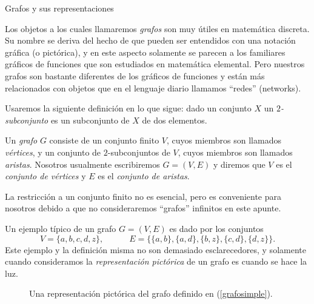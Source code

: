 \begin{section}{Grafos y sus representaciones}\label{5.1}

Los objetos a los cuales llamaremos \textit{grafos} son muy útiles en matemática discreta. Su nombre se deriva del hecho de que pueden ser entendidos con una notación gráfica (o pictórica), y en este aspecto solamente se parecen a los familiares gráficos de funciones que son estudiados en matemática elemental. Pero
nuestros grafos son bastante diferentes de los gráficos de funciones y están más relacionados con objetos que en el lenguaje diario llamamos ``redes'' (networks).  

Usaremos la siguiente definición en lo que sigue: dado un conjunto $X$ un \textit{$2$-subconjunto} es un subconjunto de $X$ de dos elementos.  

\begin{definicion} Un \textit{grafo} $G$ consiste de un   conjunto finito $V$, cuyos miembros son llamados  \textit{vértices},   y un conjunto de $2$-subconjuntos de $V$, cuyos miembros son llamados \textit{aristas}.   Nosotros usualmente escribiremos $G=(V,E)$ y diremos que $V$ es el \textit{conjunto de vértices} y $E$ es el \textit{conjunto de aristas}.
\end{definicion}

La restricción a un conjunto finito no es esencial, pero es conveniente para nosotros debido a que no consideraremos ``grafos'' infinitos en este apunte.

Un ejemplo típico de un grafo $G=(V,E)$ es dado por los conjuntos
\begin{equation}\label{grafosimple}
V=\{a,b,c,d,z\}, \qquad\quad
E=\{\{a,b\},\{a,d\},\{b,z\},\{c,d\},\{d,z\}\}.
\end{equation}
Este ejemplo y la definición misma no son demasiado esclarecedores, y solamente cuando con\-si\-de\-ra\-mos la \textit{representación pictórica} de un grafo es cuando se hace la luz. 

\begin{figure}[ht]
    \begin{center}
    \end{center}    
    \caption{Una representación pictórica del grafo definido en (\ref{grafosimple}).}\label{f5.1}
\end{figure}


\end{section}
